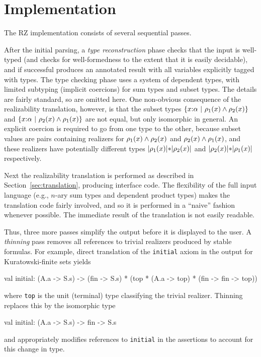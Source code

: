 \section{Implementation}
\label{sec:implementation}

The RZ implementation consists of several sequential passes.

After the initial parsing, a \emph{type reconstruction} phase checks
that the input is well-typed (and checks for well-formedness to the
extent that it is easily decidable), and if successful produces an
annotated result with all variables explicitly tagged with types. The
type checking phase uses a system of dependent types, with limited
subtyping (implicit coercions) for sum types and subset types. The
details are fairly standard, so are omitted here. One non-obvious
consequence of the realizability translation, however, is that the
subset types $\{x{:}\alpha\ |\ \rho_1(x)\land \rho_2(x)\}$ and
$\{x{:}\alpha\ |\ \rho_2(x)\land \rho_1(x)\}$ are not
equal, but only isomorphic in general. An
explicit coercion is required to go from one type to the other,
because subset values are pairs containing realizers for
$\rho_1(x)\land \rho_2(x)$ and
$\rho_2(x)\land \rho_1(x)$, and these realizers have
potentially different types $|\rho_1(x)|\mathtt{*}|\rho_2(x)|$ and
$|\rho_2(x)|\mathtt{*}|\rho_1(x)|$ respectively.

Next the realizability translation is performed as described in
Section~\ref{sec:translation}, producing interface code. The
flexibility of the full input language (e.g., $n$-ary sum types and
dependent product types) makes the translation code fairly involved,
and so it is performed in a ``naive'' fashion whenever possible. The
immediate result of the translation is not easily readable.
 
Thus, three more passes simplify the output before it is displayed to
the user. A \emph{thinning} pass removes all references to trivial
realizers produced by stable formulas. For example, direct translation
of the \texttt{initial} axiom in the output for Kuratowski-finite sets
yields
\begin{source}
val initial: (A.a -> S.s) -> 
               (fin -> S.s) * (top * (A.a -> top) * (fin -> fin -> top))
\end{source}
where \texttt{top} is the unit (terminal) type classifying the trivial realizer.  Thinning replaces this by the isomorphic type
\begin{source}
val initial: (A.a -> S.s) -> fin -> S.s
\end{source}
and appropriately modifies references to \texttt{initial} in the assertions to account for this change in type.

